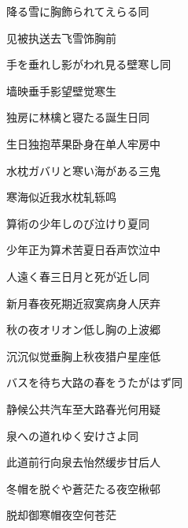 \begin{haiku}
    {\FH 降る雪に胸飾られてえらる}\hfill{\FH 同}

    {\FK 见被执送去飞雪饰胸前}
\end{haiku}

\begin{haiku}
    {\FH 手を垂れし影がわれ見る壁寒し}\hfill{\FH 同}

    {\FK 墙映垂手影望壁觉寒生}
\end{haiku}

\begin{haiku}
    {\FH 独房に林檎と寝たる誕生日}\hfill{\FH 同}

    {\FK 生日独抱苹果卧身在单人牢房中}
\end{haiku}

\begin{haiku}
    {\FH 水枕ガバリと寒い海がある}\hfill{\FH 三鬼}

    {\FK 寒海似近我水枕轧轹鸣}
\end{haiku}

\begin{haiku}
    {\FH 算術の少年しのび泣けり夏}\hfill{\FH 同}

    {\FK 少年正为算术苦夏日呑声饮泣中}
\end{haiku}

\begin{haiku}
    {\FH 人遠く春三日月と死が近し}\hfill{\FH 同}

    {\FK 新月春夜死期近寂寞病身人厌弃}
\end{haiku}

\begin{haiku}
    {\FH 秋の夜オリオン低し胸の上}\hfill{\FH 波郷}

    {\FK 沉沉似觉垂胸上秋夜猎户星座低}
\end{haiku}

\begin{haiku}
    {\FH バスを待ち大路の春をうたがはず}\hfill{\FH 同}

    {\FK 静候公共汽车至大路春光何用疑}
\end{haiku}

\begin{haiku}
    {\FH 泉への道れゆく安けさよ}\hfill{\FH 同}

    {\FK 此道前行向泉去怡然缓步甘后人}
\end{haiku}

\begin{haiku}
    {\FH 冬帽を脱ぐや蒼茫たる夜空}\hfill{\FH 楸邨}

    {\FK 脱却御寒帽夜空何苍茫}
\end{haiku}

